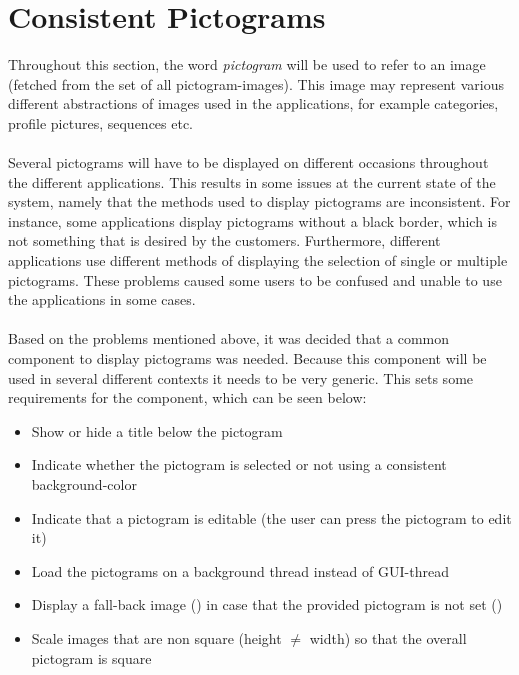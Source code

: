 
\section{Consistent Pictograms}
\label{sec:consistent_pictograms}

Throughout this section, the word \textit{pictogram} will be used to refer to an image (fetched from the set of all pictogram-images). This image may represent various different abstractions of images used in the \giraf applications, for example categories, profile pictures, sequences etc.
\\\\
Several pictograms will have to be displayed on different occasions throughout the different \giraf applications. This results in some issues at the current state of the system, namely that the methods used to display pictograms are inconsistent. For instance, some applications display pictograms without a black border, which is not something that is desired by the customers. Furthermore, different applications use different methods of displaying the selection of single or multiple pictograms. These problems caused some users to be confused and unable to use the applications in some cases. 
\\\\
Based on the problems mentioned above, it was decided that a common component to display pictograms was needed. Because this component will be used in several different contexts it needs to be very generic. This sets some requirements for the component, which can be seen below:

\begin{itemize}
	\item Show or hide a title below the pictogram
	\item Indicate whether the pictogram is selected or not using a consistent background-color
	\item Indicate that a pictogram is editable (the user can press the pictogram to edit it)
	\item Load the pictograms on a background thread instead of GUI-thread 
	\item Display a fall-back image () in case that the provided pictogram is not set ()
	\item Scale images that are non square (height $\neq$ width) so that the overall pictogram is square
\end{itemize}

